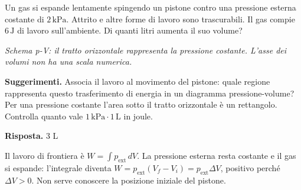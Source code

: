 \documentclass[11pt,a4paper]{article}
\begin{document}
\newpage
\begin{samepage}
\par\smallskip
Un gas si espande lentamente spingendo un pistone contro una pressione esterna costante di \(2\,\mathrm{kPa}\). Attrito e altre forme di lavoro sono trascurabili. Il gas compie \(6\,\mathrm{J}\) di lavoro sull’ambiente. Di quanti litri aumenta il suo volume?\par

\begin{center}
\par
\small\itshape Schema p-V: il tratto orizzontale rappresenta la pressione costante. L’asse dei volumi non ha una scala numerica.
\end{center}

{\small\textbf{Suggerimenti.} Associa il lavoro al movimento del pistone: quale regione rappresenta questo trasferimento di energia in un diagramma pressione-volume? Per una pressione costante l’area sotto il tratto orizzontale è un rettangolo. Controlla quanto vale \(1\,\mathrm{kPa}\cdot1\,\mathrm{L}\) in joule.\par}
\medskip\noindent\textbf{Risposta.} 3 L\par


Il lavoro di frontiera è \(W=\int p_{\mathrm{ext}}\,dV\). La pressione esterna resta costante e il gas si espande: l’integrale diventa \(W=p_{\mathrm{ext}}(V_f-V_i)=p_{\mathrm{ext}}\Delta V\), positivo perché \(\Delta V>0\). Non serve conoscere la posizione iniziale del pistone.\par


\end{samepage}
\end{document}

